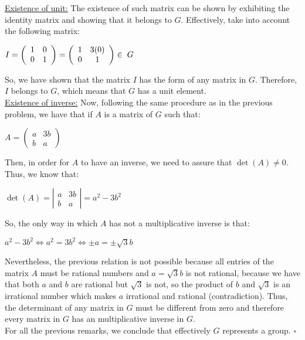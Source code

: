 \documentclass[a4paper,openany,11pt]{book}
\begin{document}
\underline{Existence of unit:} The existence of such matrix can be shown by exhibiting the identity matrix and showing that it belongs to $G$. Effectively, take into account the following matrix:

\begin{center}
	$I = \left(\begin{array}{cc}
		1 & 0\\
		0 & 1
	\end{array}\right) = \left(\begin{array}{cc}
	1 & 3(0)\\
	0 & 1
\end{array}\right) \in \hspace{0.1cm} G$
\end{center}

So, we have shown that the matrix $I$ has the form of any matrix in $G$. Therefore, $I$ belongs to $G$, which means that $G$ has a unit element.\\

\underline{Existence of inverse:} Now, following the same procedure as in the previous problem, we have that if $A$ is a matrix of $G$ such that:

\begin{center}
	$A = \left(\begin{array}{cc}
	a & 3b\\
	b & a
	\end{array}\right)$
\end{center}

Then, in order for $A$ to have an inverse, we need to assure that $\det(A) \neq 0$. Thus, we know that:

\begin{center}
	$\det(A) = \left|\begin{array}{cc}
	a & 3b\\
	b & a
	\end{array}\right| = a^{2} - 3b^{2}$
\end{center}

So, the only way in which $A$ has not a multiplicative inverse is that:

\begin{center}
	$a^{2}-3b^{2} \iff a^{2} = 3b^{2} \iff \pm a = \pm \sqrt{3}b$
\end{center}

Nevertheless, the previous relation is not possible because all entries of the matrix $A$ must be rational numbers and $a = \sqrt{3}b$ is not rational, because we have that both $a$ and $b$ are rational but $\sqrt{3}$ is not, so the product of $b$ and $\sqrt{3}$ is an irrational number which makes $a$ irrational and rational (contradiction). Thus, the determinant of any matrix in $G$ must be different from zero and therefore every matrix in $G$ has an multiplicative inverse in $G$.\\

For all the previous remarks, we conclude that effectively $G$ represents a group. \hspace{0.1cm} $\square$ 
\end{document}
